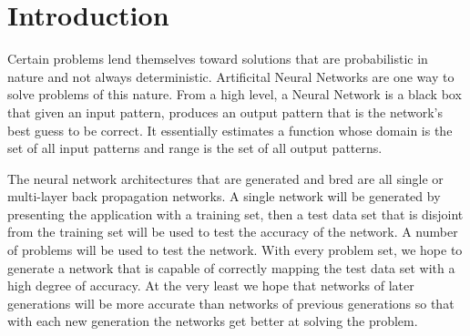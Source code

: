 \section{Introduction}
Certain problems lend themselves toward solutions that are probabilistic in nature and not always deterministic. 
Artificital Neural Networks are one way to solve problems of this nature. From a high level, a Neural Network is a black
box that given an input pattern, produces an output pattern that is the network's best guess to be correct. 
It essentially estimates a function whose domain is the set of all input patterns and range is the set of all output patterns.


The neural network architectures that are generated and bred are all single or multi-layer back propagation networks.  A single network will be generated by presenting the application with a training set, then a test data set that is disjoint from the training set will be used to test the accuracy of the network.  A number of problems will be used to test the network.  With every problem set, we hope to generate a network that is capable of correctly mapping the test data set with a high degree of accuracy.  At the very least we hope that networks of later generations will be more accurate than networks of previous generations so that with each new generation the networks get better at solving the problem.



